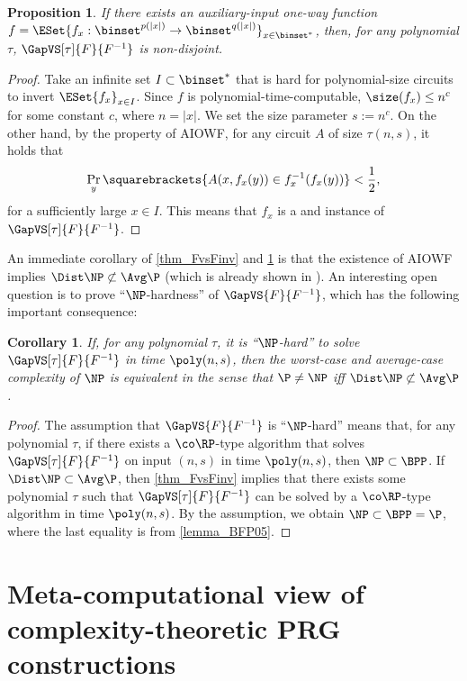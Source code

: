\documentclass[11pt]{article}
\numberwithin{equation}{section}
\newtheorem{proposition}[theorem]{Proposition}
\newtheorem{corollary}[theorem]{Corollary}
\theoremstyle{definition}
\theoremstyle{plain}
\begin{document}
\begin{proposition}
  \label{prop_AIOWF}
  If there exists an auxiliary-input one-way function
  $f = \ESet{ f_x : \binset^{p(|x|)} \to \binset^{q(|x|)} }_{x \in \binset^*}$,
  then,
  for any polynomial $\tau$,
  $\GapVS[\tau]{F}{F^{-1}}$ is non-disjoint.
\end{proposition}
\begin{proof}
  Take an infinite set $I \subset \binset^*$ that is hard for polynomial-size circuits to invert $\ESet{f_x}_{x \in I}$.
  Since $f$ is polynomial-time-computable, $\size(f_x) \le n^c$ for some constant $c$,
  where $n = |x|$.
  We set the size parameter $s := n^c$.
  On the other hand,
  by the property of AIOWF,
  for any circuit $A$ of size $\tau(n, s)$,
  it holds that
  $$\Pr_y \squarebrackets{ A(x, f_x(y)) \in f_x^{-1}(f_x(y)) } < \frac{1}{2},$$
  for a sufficiently large $x \in I$.
  This means that $f_x$ is a \Yes and \No instance of $\GapVS[\tau]{F}{F^{-1}}$.
\end{proof}

An immediate corollary of
\cref{thm_FvsFinv}
and
\cref{prop_AIOWF}
is that the existence of AIOWF implies $\Dist\NP \not\subset \Avg\P$
(which is already shown in \cite{Hirahara18_focs_conf}).
An interesting open question is to prove ``$\NP$-hardness'' of $\GapVS{F}{F^{-1}}$,
which has the following important consequence:
\begin{corollary}
  If,
  for any polynomial $\tau$,
  it is \textup{``}$\NP$-hard\textup{''} to solve $\GapVS[\tau]{F}{F^{-1}}$ in time $\poly(n, s)$,
  then
  the worst-case and average-case complexity of $\NP$ is equivalent
  in the sense that $\P \neq \NP$ iff $\Dist\NP \not\subset \Avg\P$.
\end{corollary}

\begin{proof}
  The assumption that
  $\GapVS{F}{F^{-1}}$
  is ``$\NP$-hard''
  means that, for any polynomial $\tau$,
  if there exists a $\co\RP$-type algorithm
  that solves $\GapVS[\tau]{F}{F^{-1}}$
  on input $(n, s)$ in time $\poly(n, s)$,
  then
  $\NP \subset \BPP$.
  If $\Dist\NP \subset \Avg\P$,
  then
  \cref{thm_FvsFinv}
  implies that
  there exists some polynomial $\tau$ such that
  $\GapVS[\tau]{F}{F^{-1}}$ can be solved by a $\co\RP$-type algorithm
  in time $\poly(n, s)$.
  By the assumption, we obtain $\NP \subset \BPP = \P$, where the last equality is from \cref{lemma_BFP05}.
\end{proof}

\section{Meta-computational view of complexity-theoretic PRG constructions}
\label{section_Genral}
\end{document}
